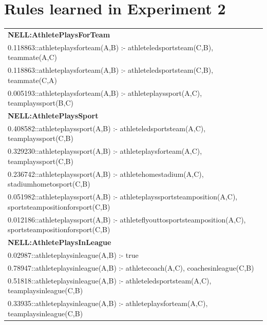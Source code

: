 \documentclass[akbc,twoside,11pt]{article}
\newcommand{\arcchit}[1]{\textcolor{red}{A: {#1}}}
\begin{document}
\section{Rules learned in Experiment 2}\label{appendix:2}

\begin{footnotesize}
\begin{tabular}{|l|}
\hline
\textbf{NELL:AthletePlaysForTeam} \\
0.118863::athleteplaysforteam(A,B) :- athleteledsportsteam(C,B), teammate(A,C) \\
0.118863::athleteplaysforteam(A,B) :- athleteledsportsteam(C,B), teammate(C,A) \\
0.005193::athleteplaysforteam(A,B) :- athleteplayssport(A,C), teamplayssport(B,C) \\[2ex]
\textbf{NELL:AthletePlaysSport} \\
0.408582::athleteplayssport(A,B) :- athleteledsportsteam(A,C), teamplayssport(C,B) \\
0.329230::athleteplayssport(A,B) :- athleteplaysforteam(A,C), teamplayssport(C,B) \\
0.236742::athleteplayssport(A,B) :- athletehomestadium(A,C), stadiumhometosport(C,B) \\
0.051982::athleteplayssport(A,B) :- athleteplayssportsteamposition(A,C), sportsteampositionforsport(C,B) \\
0.012186::athleteplayssport(A,B) :- athleteflyouttosportsteamposition(A,C), sportsteampositionforsport(C,B) \\[2ex]
\textbf{NELL:AthletePlaysInLeague} \\
0.02987::athleteplaysinleague(A,B) :- true \\
0.78947::athleteplaysinleague(A,B) :- athletecoach(A,C), coachesinleague(C,B) \\
0.51818::athleteplaysinleague(A,B) :- athleteledsportsteam(A,C), teamplaysinleague(C,B) \\
0.33935::athleteplaysinleague(A,B) :- athleteplaysforteam(A,C), teamplaysinleague(C,B) \\

\end{tabular}
\end{footnotesize}
\end{document}
